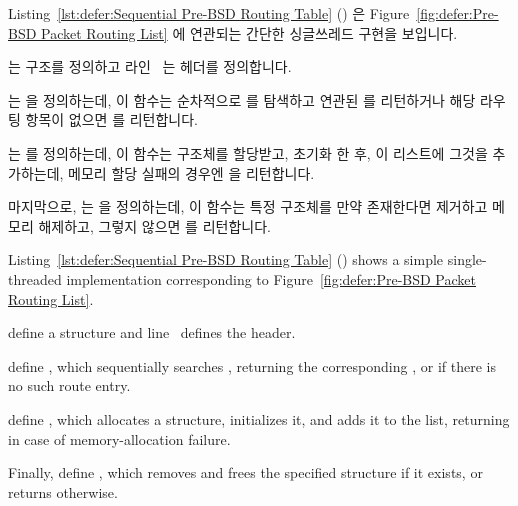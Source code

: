 Listing~\ref{lst:defer:Sequential Pre-BSD Routing Table} ()
은
Figure~\ref{fig:defer:Pre-BSD Packet Routing List} 에 연관되는 간단한
싱글쓰레드 구현을 보입니다.
\begin{fcvref}
 는  구조를 정의하고 라인~ 는
 헤더를 정의합니다.
\end{fcvref}
\begin{fcvref}
 는  을 정의하는데, 이 함수는 순차적으로
 를 탐색하고 연관된  를 리턴하거나 해당 라우팅
항목이 없으면  를 리턴합니다.
\end{fcvref}
\begin{fcvref}
 는  를 정의하는데, 이 함수는
 구조체를 할당받고, 초기화 한 후, 이 리스트에 그것을
추가하는데, 메모리 할당 실패의 경우엔  을 리턴합니다.
\end{fcvref}
\begin{fcvref}
마지막으로,  는  을 정의하는데, 이 함수는
특정  구조체를 만약 존재한다면 제거하고 메모리 해제하고, 그렇지
않으면  를 리턴합니다.
\end{fcvref}

\iffalse

Listing~\ref{lst:defer:Sequential Pre-BSD Routing Table} ()
shows a simple single-threaded implementation corresponding to
Figure~\ref{fig:defer:Pre-BSD Packet Routing List}.
\begin{fcvref}
 define a  structure and
line~ defines
the  header.
\end{fcvref}
\begin{fcvref}
 define , which sequentially searches
, returning the corresponding , or
 if there is no such route entry.
\end{fcvref}
\begin{fcvref}
 define , which allocates a
 structure, initializes it, and adds it to the
list, returning  in case of memory-allocation failure.
\end{fcvref}
\begin{fcvref}
Finally,  define , which removes and
frees the specified  structure if it exists,
or returns  otherwise.
\end{fcvref}

